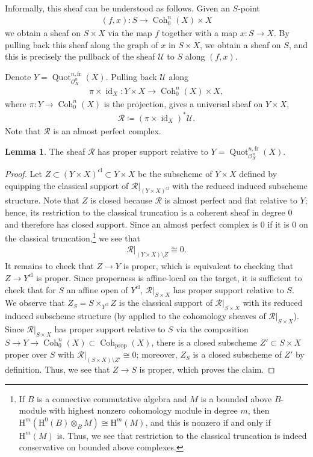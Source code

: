 \documentclass{article}
\numberwithin{equation}{section}
\theoremstyle{quest}
\theoremstyle{definition}
\newtheorem{lem}[thm]{Lemma}
\theoremstyle{remark}
\DeclareMathOperator{\id}{id}
\DeclareMathOperator{\Coh}{Coh}
\DeclareMathOperator{\Quot}{Quot}
\begin{document}
Informally, this sheaf can be understood as follows. Given an $S$-point 
\begin{align*}
	(f,x):S\to \Coh^n_0(X)\times X
\end{align*} 
we obtain a sheaf on $S\times X$ via the map $f$ together with a map $x:S\to X$. By pulling back this sheaf along the graph of $x$ in $S\times X$, we obtain a sheaf on $S$, and this is precisely the pullback of the sheaf $\mathscr{U}$ to $S$ along $(f,x)$.

Denote $Y=\Quot^{n,\text{fr}}_{\mathscr{O}_X^n}(X)$. Pulling back $\mathscr{U}$ along
\begin{align*}
	\pi \times \id_X:Y\times X\to \Coh^n_0(X) \times X,
\end{align*} 
where $\pi:Y\to \Coh^n_0(X)$ is the projection, gives a universal sheaf on $Y\times X$,
\begin{align*}
	\mathscr{R}\coloneqq (\pi\times \id_X)^*\mathscr{U}.
\end{align*} 
Note that $\mathscr{R}$ is an almost perfect complex.
\begin{lem}\label{lem:R-has-proper-support}
	The sheaf $\mathscr{R}$ has proper support relative to $Y= \Quot^{n,\text{fr}}_{\mathscr{O}_X^n}(X)$.
\end{lem} 
\begin{proof}
	Let $Z\subset (Y\times X)^{\text{cl}}\subset Y\times X$ be the subscheme of $Y\times X$ defined by equipping the classical support of $\mathscr{R}|_{(Y\times X)^{\text{cl}}}$ with the reduced induced subscheme structure. Note that $Z$ is closed because $\mathscr{R}$ is almost perfect and flat relative to $Y$; hence, its restriction to the classical truncation is a coherent sheaf in degree 0 and therefore has closed support. Since an almost perfect complex is 0 if it is 0 on the classical truncation,\footnote{If $B$ is a connective commutative algebra and $M$ is a bounded above $B$-module with highest nonzero cohomology module in degree $m$, then $\mathrm H^m(\mathrm H^0(B)\otimes _BM)\cong \mathrm H^m(M)$, and this is nonzero if and only if $\mathrm H^m(M)$ is. Thus, we see that restriction to the classical truncation is indeed conservative on bounded above complexes.} we see that
\begin{align*}
	\mathscr{R}|_{(Y\times X)\setminus Z}\cong 0.
\end{align*} 
It remains to check that $Z\to Y$ is proper, which is equivalent to checking that $Z\to Y^{\text{cl}}$ is proper. Since properness is affine-local on the target, it is sufficient to check that for $S$ an affine open of $Y^{\text{cl}}$, $\mathscr{R}|_{S \times X}$ has proper support relative to $S$. We observe that $Z_S=S\times_{Y^{\text{cl}}} Z$ is the classical support of $\mathscr{R}|_{S\times X}$ with its reduced induced subscheme structure (by \cite[Tag 056J]{stacks} applied to the cohomology sheaves of $\mathscr{R}|_{S\times X}$). Since $\mathscr{R}|_{S\times X}$ has proper support relative to $S$ via the composition $S\to Y\to \Coh^n_0(X)\subset \Coh_{\text{prop}}(X)$, there is a closed subscheme $Z'\subset S\times X$ proper over $S$ with $\mathscr{R}|_{(S\times X)\setminus Z'}\cong 0$; moreover, $Z_S$ is a closed subscheme of $Z '$ by definition. Thus, we see that $Z\to S$ is proper, which proves the claim.
\end{proof} 
\end{document}
